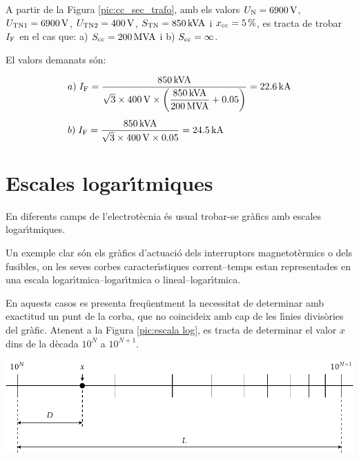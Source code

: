 \begin{exemple}
    A partir de la Figura \vref{pic:cc_sec_trafo}, amb els valors
    $U_\mathrm{N}=\SI{6900}{V}$, $U_\mathrm{TN1}=\SI{6900}{V}$,
    $U_\mathrm{TN2}=\SI{400}{V}$, $S_\mathrm{TN}=\SI{850}{kVA}$ i
    $x_\mathrm{cc}=\SI{5}{\%}$, es tracta de trobar $I_\mathrm{F}$ en el cas
    que: a) $S_\mathrm{cc}=\SI{200}{MVA}$ i b) $S_\mathrm{cc}=\infty$.

    El valors demanats s\'{o}n:

    \begin{align*}
       &a)\;I_\mathrm{F} = \frac{\SI{850}{kVA}}{\sqrt{3}\times \SI{400}{V}\times
       \left(\dfrac{\SI{850}{kVA}}{\SI{200}{MVA}} +
       \num{0,05}\right)} = \SI{22,6}{kA} \\[1ex]
       &b)\;I_\mathrm{F} = \frac{\SI{850}{kVA}}{\sqrt{3}\times \SI{400}{V}\times
       \num{0,05}} = \SI{24,5}{kA}
    \end{align*}
\end{exemple}




\section{Escales logar\'{\i}tmiques} 

En diferents camps de l'electrot\`{e}cnia \'{e}s usual trobar-se gr\`{a}fics amb escales
logar\'{\i}tmiques.

Un exemple clar s\'{o}n els gr\`{a}fics d'actuaci\'{o} dels interruptors magnetot\`{e}rmics o dels
fusibles, on les seves corbes caracter\'{\i}stiques corrent--temps estan representades en
una escala logar\'{\i}tmica--logar\'{\i}tmica o lineal--logar\'{\i}tmica.

En aquests casos es presenta freq\"{u}entment la necessitat de determinar amb exactitud un
punt de la corba, que no coincideix amb cap de les l\'{\i}nies divis\`{o}ries del gr\`{a}fic. Atenent a
la Figura \vref{pic:escala log}, es tracta de determinar el valor $x$ dins de la d\`{e}cada
$10^N$ a $10^{N+1}$.

\begin{center}
    \includegraphics{Imatges/Cap-CalcBas-EscalesLog.pdf}
    \label{pic:escala log}
\end{center}

